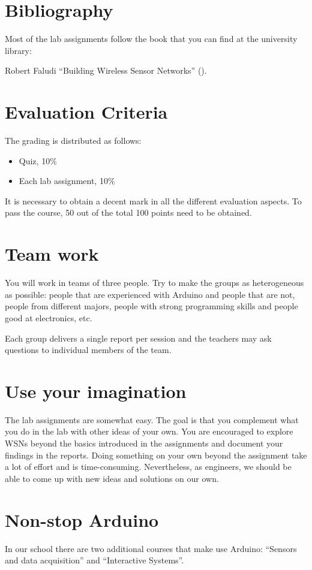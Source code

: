 \section{Bibliography}

Most of the lab assignments follow the book that you can find at the university library:

Robert Faludi ``Building Wireless Sensor Networks'' (\cite{faludi2010bws}).


\section{Evaluation Criteria}

The grading is distributed as follows:
\begin{itemize}
\item Quiz, 10\%
\item Each lab assignment, 10\%
\end{itemize}

It is necessary to obtain a decent mark in all the different evaluation aspects.
To pass the course, 50 out of the total 100 points need to be obtained.

\section{Team work}

You will work in teams of three people.
Try to make the groups as heterogeneous as possible: people that are experienced with Arduino and people that are not, people from different majors, people with strong programming skills and people good at electronics, etc.

Each group delivers a single report per session and the teachers may ask questions to individual members of the team.

\section{Use your imagination}
The lab assignments are somewhat easy.
The goal is that you complement what you do in the lab with other ideas of your own.
You are encouraged to explore WSNs beyond the basics introduced in the assignments and document your findings in the reports.
Doing something on your own beyond the assignment take a lot of effort and is time-consuming.
Nevertheless, as engineers, we should be able to come up with new ideas and solutions on our own.

\section{Non-stop Arduino}
In our school there are two additional courses that make use Arduino: ``Sensors and data acquisition'' and ``Interactive Systems''.


